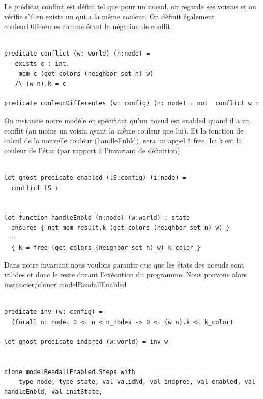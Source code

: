\documentclass[11pt]{article}
\begin{document}
Le prédicat conflict est défini tel que pour un noeud, on regarde ses voisins et on vérifie s'il en existe un qui a la même couleur.
On définit également couleurDifferentes comme étant la négation de conflit. 

\lstset{language=why3,label= ,caption= ,captionpos=b,numbers=none}
\begin{lstlisting}

predicate conflict (w: world) (n:node) =
   exists c : int.
    mem c (get_colors (neighbor_set n) w)
   /\ (w n).k = c

predicate couleurDifferentes (w: config) (n: node) = not  conflict w n

\end{lstlisting}

On instancie notre modèle en spécifiant qu'un noeud est enabled quand il a un conflit (au moins un voisin ayant la même couleur que lui).
Et la fonction de calcul de la nouvelle couleur (handleEnbld), sera un appel à free. 
Ici  k est la couleur de l'état (par rapport à l'invariant de définition)

\lstset{language=why3,label= ,caption= ,captionpos=b,numbers=none}
\begin{lstlisting}

let ghost predicate enabled (lS:config) (i:node) =
  conflict lS i


let function handleEnbld (n:node) (w:world) : state
  ensures { not mem result.k (get_colors (neighbor_set n) w) }
  =
  { k = free (get_colors (neighbor_set n) w) k_color }

\end{lstlisting}

Dans notre invariant nous voulons garantir que que les états des noeuds sont valides et donc le reste durant l'exécution du programme.
Nous pouvons alors instancier/cloner modelReadallEnabled

\lstset{language=why3,label= ,caption= ,captionpos=b,numbers=none}
\begin{lstlisting}

predicate inv (w: config) =
  (forall n: node. 0 <= n < n_nodes -> 0 <= (w n).k <= k_color)

let ghost predicate indpred (w:world) = inv w


clone modelReadallEnabled.Steps with
    type node, type state, val validNd, val indpred, val enabled, val handleEnbld, val initState,

\end{lstlisting}
\end{document}
